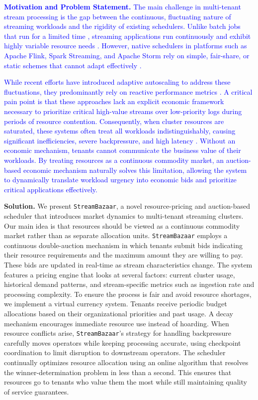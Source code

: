 \documentclass[lettersize,journal]{IEEEtran}
\begin{document}
\textcolor{blue}{\textbf{Motivation and Problem Statement.}}
\textcolor{blue}{The main challenge in multi-tenant stream processing is the gap between the continuous, fluctuating nature of streaming workloads and the rigidity of existing schedulers. Unlike batch jobs that run for a limited time \cite{10820033}, streaming applications run continuously and exhibit highly variable resource needs \cite{10.1145/2517349.2522737}. However, native schedulers in platforms such as Apache Flink, Spark Streaming, and Apache Storm rely on simple, fair-share, or static schemes that cannot adapt effectively \cite{chang2025eva,10.1145/3267809.3267832, lian2023conttune, 10.1145/2517349.2522737,younesi2025autostreampipellmassistedautomatic}.}

\textcolor{blue}{While recent efforts have introduced adaptive autoscaling to address these fluctuations, they predominantly rely on reactive performance metrics \cite{chen2025oceanus,wang2025capsys,kalavri2018three,10.1145/3267809.3267832,ntouni2024talos}. A critical pain point is that these approaches lack an explicit economic framework necessary to prioritize critical high-value streams over low-priority logs during periods of resource contention. Consequently, when cluster resources are saturated, these systems often treat all workloads indistinguishably, causing significant inefficiencies, severe backpressure, and high latency \cite{lian2023conttune}. Without an economic mechanism, tenants cannot communicate the business value of their workloads. By treating resources as a continuous commodity market, an auction-based economic mechanism naturally solves this limitation, allowing the system to dynamically translate workload urgency into economic bids and prioritize critical applications effectively.}

\textbf{Solution.} We present \texttt{StreamBazaar}, a novel resource-pricing and auction-based scheduler that introduces market dynamics to multi-tenant streaming clusters. Our main idea is that resources should be viewed as a continuous commodity market rather than as separate allocation units. \texttt{StreamBazaar} employs a continuous double-auction mechanism in which tenants submit bids indicating their resource requirements and the maximum amount they are willing to pay. These bids are updated in real-time as stream characteristics change. The system features a pricing engine that looks at several factors: current cluster usage, historical demand patterns, and stream-specific metrics such as ingestion rate and processing complexity. To ensure the process is fair and avoid resource shortages, we implement a virtual currency system. Tenants receive periodic budget allocations based on their organizational priorities and past usage. A decay mechanism encourages immediate resource use instead of hoarding. When resource conflicts arise, \texttt{StreamBazaar}'s strategy for handling backpressure carefully moves operators while keeping processing accurate, using checkpoint coordination to limit disruption to downstream operators. The scheduler continually optimizes resource allocation using an online algorithm that resolves the winner-determination problem in less than a second. This ensures that resources go to tenants who value them the most while still maintaining quality of service guarantees.
\end{document}
